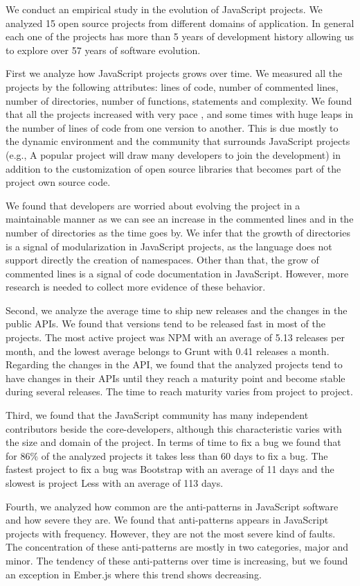 We conduct an empirical study in the evolution of JavaScript projects. We analyzed 15 open source projects from different domains of application. In general each one of the projects has more than 5 years of development history allowing us to explore over 57 years of software evolution.

First we analyze how JavaScript projects grows over time. We measured all the projects by the following attributes: lines of code, number of commented lines, number of directories, number of functions, statements and complexity. We found that all the projects increased with very pace , and some times with huge leaps in the number of lines of code from one version to another. This is due mostly to the dynamic environment and the community that surrounds JavaScript projects (e.g., A popular project will draw many developers to join the development) in addition to the customization of open source libraries that becomes part of the project own source code. 

We found that developers are worried about evolving the project in a maintainable manner as we can see an increase in the commented lines and in the number of directories as the time goes by. We infer that the growth of directories is a signal of modularization in JavaScript projects, as the language does not support directly the creation of namespaces. Other than that, the grow of commented lines is a signal of code documentation in JavaScript. However, more research is needed to collect more evidence of these behavior.

Second, we analyze the average time to ship new releases and the changes in the public APIs. We found that versions tend to be released fast in most of the projects. The most active project was NPM with an average of 5.13 releases per month, and the lowest average belongs to Grunt with 0.41 releases a month. Regarding the changes in the API, we found that the analyzed projects tend to have changes in their APIs until they reach a maturity point and become stable during several releases. The time to reach maturity varies from project to project.

Third, we found that the JavaScript community has many independent contributors beside the core-developers, although this characteristic varies with the size and domain of the project. In terms of time to fix a bug we found that for 86\% of the analyzed projects it takes less than 60 days to fix a bug. The fastest project to fix a bug was Bootstrap with an average of 11 days and the slowest is project Less with an average of 113 days.  

Fourth, we analyzed how common are the anti-patterns in JavaScript software and how severe they are. We found that anti-patterns appears in JavaScript projects with frequency. However, they are not the most severe kind of faults. The concentration of these anti-patterns are mostly in two categories, major and minor. The tendency of these anti-patterns over time is increasing, but we found an exception in Ember.js where this trend shows decreasing.   